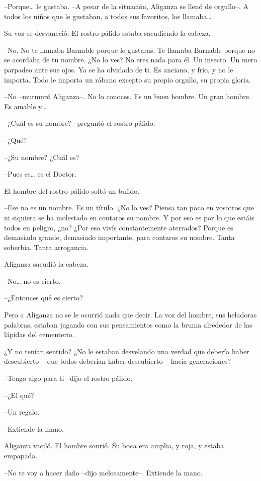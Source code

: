 --Porque… le gustaba. --A pesar de la situación, Aliganza se llenó de orgullo--. A todos los niños que le gustaban, a todos sus favoritos, los llamaba…

Su voz se desvaneció. El rostro pálido estaba sacudiendo la cabeza.

--No. No te llamaba Barnable porque le gustaras. Te llamaba Barnable porque no se acordaba de tu nombre. ¿No lo ves? No eres nada para él. Un insecto. Un mero parpadeo ante sus ojos. Ya se ha olvidado de ti. Es anciano, y frío, y no le importa. Todo le importa un rábano excepto su propio orgullo, su propia gloria.

--No --murmuró Aliganza--. No lo conoces. Es un buen hombre. Un gran hombre. Es amable y…

--¿Cuál es su nombre? --preguntó el rostro pálido.

--¿Qué?

--¿Su nombre? ¿Cuál es?

--Pues es… es el Doctor.

El hombre del rostro pálido soltó un bufido.

--Ese no es un nombre. Es un título. ¿No lo ves? Piensa tan poco en vosotros que ni siquiera se ha molestado en contaros su nombre. Y por eso es por lo que estáis todos en peligro, ¿no? ¿Por eso vivís constantemente aterrados? Porque es demasiado grande, demasiado importante, para contaros su nombre. Tanta soberbia. Tanta arrogancia.

Aliganza sacudió la cabeza.

--No… no es cierto.

--¿Entonces qué es cierto?

Pero a Aliganza no se le ocurrió nada que decir. La voz del hombre, sus heladoras palabras, estaban jugando con sus pensamientos como la bruma alrededor de las lápidas del cementerio.

¿Y no tenían sentido? ¿No le estaban desvelando una verdad que debería haber descubierto – que todos deberían haber descubierto – hacía generaciones?

--Tengo algo para ti --dijo el rostro pálido.

--¿El qué?

--Un regalo.

--Extiende la mano.

Aliganza vaciló. El hombre sonrió. Su boca era amplia, y roja, y estaba empapada.

--No te voy a hacer daño --dijo melosamente--. Extiende la mano.

